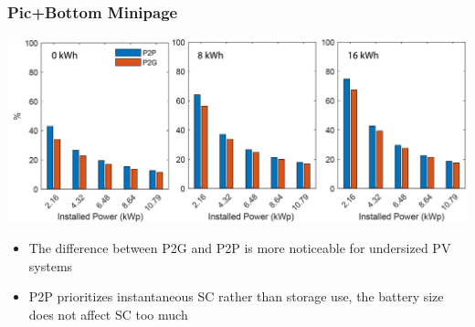 \documentclass[xcolor=dvipsnames,aspectratio=169]{beamer} %
\begin{document}
{\begin{frame}[t]
\begin{minipage}{0.9\paperwidth}
\begin{itemize}
\end{itemize}

\end{minipage}

\end{frame}

\begin{frame}[t]

\frametitle{Pic+Bottom Minipage}

\vspace{-20pt}
\begin{minipage}[t]{0.8\paperwidth}
\includegraphics[height=0.55\paperheight]{Immagini/SCchoice1111.pdf}
\end{minipage}
\begin{minipage}[b]{0.8\paperwidth}
\vspace{8pt}
\begin{itemize}
     \item The difference between P2G and P2P is more noticeable for undersized PV systems
     \item P2P prioritizes instantaneous SC rather than storage use, the battery size does not affect SC too much
\end{itemize}


\end{minipage}
\end{frame}}
\end{document}
